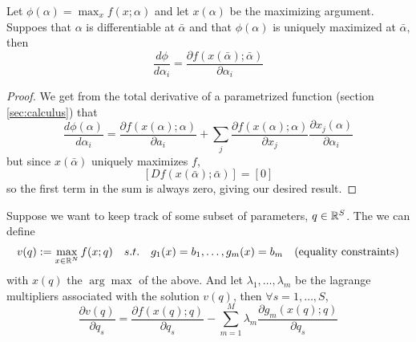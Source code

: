 \begin{prop}
  Let $\phi(\alpha) = \max_x f(x; \alpha)$ and let $x(\alpha)$ be the
  maximizing argument. Suppoes that $\alpha$ is differentiable at
  $\bar \alpha$ and that $\phi(\alpha)$ is uniquely maximized at $\bar
  \alpha$, then
  \[
  \frac{d \phi}{d \alpha_i} 
  = \frac{\partial f(x(\bar \alpha); \bar \alpha)}{\partial \alpha_i}
  \]
\end{prop}

\begin{proof}
  We get from the total derivative of a parametrized function (section
  \ref{sec:calculus}) that 
  \[
  \frac{d \phi(\alpha)}{d \alpha_i}
  = \frac{\partial f(x(\alpha); \alpha)}{\partial a_i}
  + \sum_j 
  \frac{\partial f(x(\alpha);\alpha)}{\partial x_j}
  \frac{\partial x_j(\alpha)}{\partial \alpha_i}
  \]
  but since $x(\bar \alpha)$ uniquely maximizes $f$,
  \[
  [Df(x(\bar \alpha); \bar \alpha)] = [0]
  \]
  so the first term in the sum is always zero, giving our desired result.
\end{proof}

\begin{theorem}
  Suppose we want to keep track of some subset of parameters, $q \in
  {\mathbb R}^S$. The we can define
  \begin{align}
    v(q) := \max_{x \in {\mathbb R}^N} f(x; q) \quad s.t. \quad 
    & g_1(x) = b_1, \dots, g_m(x) = b_m & \text{(equality constraints)} \notag
  \end{align}
  with $x(q)$ the $\arg \max$ of the above. And let $\lambda_1, \dots,
  \lambda_m$ be the lagrange multipliers associated with the solution
  $v(q)$, then $\forall s = 1, \dots, S$,
  \[
  \frac{\partial v(q)}{\partial q_s} 
  = \frac{\partial f(x(q); q)}{\partial q_s}
  - \sum_{m=1}^M \lambda_m \frac{\partial g_m(x(q); q)}{\partial q_s}
  \]
\end{theorem}

